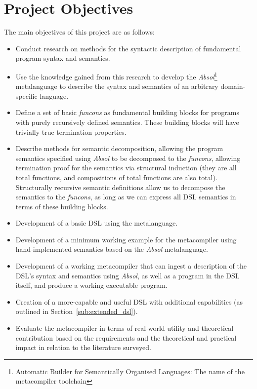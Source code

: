 \documentclass[a4paper,11pt]{report}
\begin{document}
\section{Project Objectives} %
\label{sec:project_objectives}
The main objectives of this project are as follows:
\begin{itemize}
    \item Conduct research on methods for the syntactic description of fundamental program syntax and semantics.
    \item Use the knowledge gained from this research to develop the \textit{Absol}\footnote{Automatic Builder for Semantically Organised Languages: The name of the metacompiler toolchain} metalanguage to describe the syntax and semantics of an arbitrary domain-specific language.
    \item Define a set of basic \textit{funcons} as fundamental building blocks for programs with purely recursively defined semantics. 
    These building blocks will have trivially true termination properties.
    \item Describe methods for semantic decomposition, allowing the program semantics specified using \textit{Absol} to be decomposed to the \textit{funcons}, allowing termination proof for the semantics via structural induction (they are all total functions, and compositions of total functions are also total).
    Structurally recursive semantic definitions allow us to decompose the semantics to the \textit{funcons}, as long as we can express all DSL semantics in terms of these building blocks. 
    \item Development of a basic DSL using the metalanguage.
    \item Development of a minimum working example for the metacompiler using hand-implemented semantics based on the \textit{Absol} metalanguage.
    \item Development of a working metacompiler that can ingest a description of the DSL's syntax and semantics using \textit{Absol}, as well as a program in the DSL itself, and produce a working executable program.
    \item Creation of a more-capable and useful DSL with additional capabilities (as outlined in Section~\ref{sub:extended_dsl}).
    \item Evaluate the metacompiler in terms of real-world utility and theoretical contribution based on the requirements and the theoretical and practical impact in relation to the literature surveyed.
\end{itemize}
\end{document}
